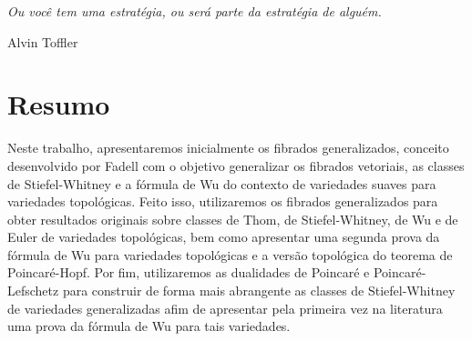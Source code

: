\documentclass[12pt,oneside]{book} %
\begin{document}
\newpage
\thispagestyle{empty}

\begin{flushright}
 \begin{minipage}{5cm}
  \begin{flushright}
   \vspace{22cm}\textit{Ou você tem uma estratégia, ou será parte da estratégia de alguém.}
   
   \vspace{0.2cm} Alvin Toffler
  \end{flushright}
 \end{minipage}
\end{flushright}










\chapter*{Resumo}
\thispagestyle{empty}

Neste trabalho, apresentaremos inicialmente os fibrados generalizados, conceito desenvolvido por Fadell com o objetivo generalizar os fibrados vetoriais, as classes de Stiefel-Whitney e a fórmula de Wu do contexto de variedades suaves para variedades topológicas. Feito isso, utilizaremos os fibrados generalizados para obter resultados originais sobre classes de Thom, de Stiefel-Whitney, de Wu e de Euler de variedades topológicas, bem como apresentar uma segunda prova da fórmula de Wu para variedades topológicas e a versão topológica do teorema de Poincaré-Hopf. Por fim, utilizaremos as dualidades de Poincaré e Poincaré-Lefschetz para construir de forma mais abrangente as classes de Stiefel-Whitney de variedades generalizadas afim de apresentar pela primeira vez na literatura uma prova da fórmula de Wu para tais variedades.
\end{document}
